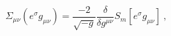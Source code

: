 \begin{equation}
\Sigma_{\mu \nu}(e^{\sigma}g_{\mu \nu})=\frac{-2}{\sqrt{-g}}
\frac{\delta}{\delta g^{\mu\nu} } S_{m}[e^{\sigma}g_{\mu \nu}]~,
\end{equation}

